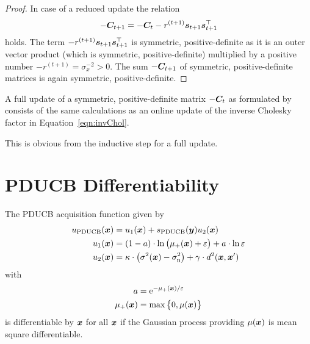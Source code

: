\begin{proof}
    In case of a reduced update the relation
    \begin{equation*}
        -\bm{C}_{t+1} = -\bm{C}_t - r^{(t+1)} \bm{s}_{t+1} \bm{s}_{t+1}^{\top}
    \end{equation*}
    holds. The term $- r^{(t+1)} \bm{s}_{t+1} \bm{s}_{t+1}^{\top}$ is symmetric, 
    positive-definite as it is an outer vector product (which is symmetric, 
    positive-definite) multiplied by a positive number $-r^{(t+1)} 
    = \sigma_x^{-2} > 0$. The sum $-\bm{C}_{t+1}$ of symmetric, 
    positive-definite matrices is again symmetric, positive-definite.
\end{proof}

\begin{corollary}
    A full update of a symmetric, positive-definite matrix $-\bm{C}_t$ as 
    formulated by \textcite[equation~2.9]{Csato:2002fp} consists of the same 
    calculations as an online update of the inverse Cholesky factor in 
    Equation~\ref{eqn:invChol}.
\end{corollary}
This is obvious from the inductive step for a full update.

\chapter{PDUCB Differentiability}\label{sec:pducb-diff}
\begin{theorem}
    The PDUCB acquisition function given by
    \begin{align*}
    u\ped{PDUCB}(\vc x) &= u_1(\vc x) + s\ped{PDUCB}(\vc y) u_2(\vc x) \\
    u_1(\vc x) &= \del{1 - a} \cdot \ln\del{\mu_+(\vc x) + \varepsilon} 
    + a \cdot \ln \varepsilon \\
    u_2(\vc x) &= \kappa \cdot \del[1]{\sigma^2(\vc x) - \sigma\ped{n}^2} 
    + \gamma \cdot d^2(\vc x, \vc x')
    \end{align*}
    with
    \begin{align*}
    a &= \e^{-\mu_+(\vc x) / \varepsilon} \\
    \mu_+(\vc x) &= \max\cbr{0, \mu(\vc x)}
    \end{align*}
    is differentiable by $\bm{x}$ for all $\bm{x}$ if the Gaussian process 
    providing $\mu(\bm{x})$ is mean square differentiable.
\end{theorem}

